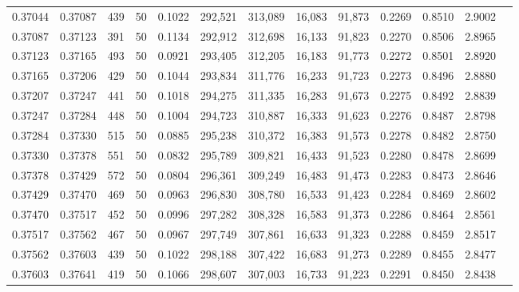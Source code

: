 \begin{tabular}{rrrrrrrrrrrrr}
0.37044 & 0.37087 &   439 &  50 &                                     0.1022 & 292,521 & 313,089 &  16,083 &  91,873 & 0.2269 & 0.8510 & 2.9002 \\
0.37087 & 0.37123 &   391 &  50 &                                     0.1134 & 292,912 & 312,698 &  16,133 &  91,823 & 0.2270 & 0.8506 & 2.8965 \\
0.37123 & 0.37165 &   493 &  50 &                                     0.0921 & 293,405 & 312,205 &  16,183 &  91,773 & 0.2272 & 0.8501 & 2.8920 \\
0.37165 & 0.37206 &   429 &  50 &                                     0.1044 & 293,834 & 311,776 &  16,233 &  91,723 & 0.2273 & 0.8496 & 2.8880 \\
0.37207 & 0.37247 &   441 &  50 &                                     0.1018 & 294,275 & 311,335 &  16,283 &  91,673 & 0.2275 & 0.8492 & 2.8839 \\
0.37247 & 0.37284 &   448 &  50 &                                     0.1004 & 294,723 & 310,887 &  16,333 &  91,623 & 0.2276 & 0.8487 & 2.8798 \\
0.37284 & 0.37330 &   515 &  50 &                                     0.0885 & 295,238 & 310,372 &  16,383 &  91,573 & 0.2278 & 0.8482 & 2.8750 \\
0.37330 & 0.37378 &   551 &  50 &                                     0.0832 & 295,789 & 309,821 &  16,433 &  91,523 & 0.2280 & 0.8478 & 2.8699 \\
0.37378 & 0.37429 &   572 &  50 &                                     0.0804 & 296,361 & 309,249 &  16,483 &  91,473 & 0.2283 & 0.8473 & 2.8646 \\
0.37429 & 0.37470 &   469 &  50 &                                     0.0963 & 296,830 & 308,780 &  16,533 &  91,423 & 0.2284 & 0.8469 & 2.8602 \\
0.37470 & 0.37517 &   452 &  50 &                                     0.0996 & 297,282 & 308,328 &  16,583 &  91,373 & 0.2286 & 0.8464 & 2.8561 \\
0.37517 & 0.37562 &   467 &  50 &                                     0.0967 & 297,749 & 307,861 &  16,633 &  91,323 & 0.2288 & 0.8459 & 2.8517 \\
0.37562 & 0.37603 &   439 &  50 &                                     0.1022 & 298,188 & 307,422 &  16,683 &  91,273 & 0.2289 & 0.8455 & 2.8477 \\
0.37603 & 0.37641 &   419 &  50 &                                     0.1066 & 298,607 & 307,003 &  16,733 &  91,223 & 0.2291 & 0.8450 & 2.8438 \\

\end{tabular}
